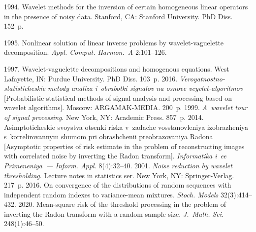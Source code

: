  \begin{multicols}{2}

\renewcommand{\bibname}{\protect\rmfamily References}

{\small\frenchspacing
 {%
 \begin{thebibliography}{99}

 1994. {Wavelet methods for the inversion of certain 
 homogeneous linear operators in the presence of noisy data.} 
 Stanford, CA: Stanford University. PhD Diss. 152~p.
 
 1995. Nonlinear solution of linear 
inverse problems by wavelet-vaguelette decomposition. 
\textit{Appl. Comput. Harmon.~A} 2:101--126.

 1997. 
{Wavelet-vaguelette decompositions and homogenous equations}. 
West Lafayette, IN: Purdue University. PhD Diss. 103~p.
 2016. \textit{Veroyatnostno-statisticheskie metody analiza 
 i~obrabotki signalov na osnove veyvlet-algoritmov} 
 [Probabilistic-statistical methods of signal analysis and 
 processing based on wavelet algorithms]. Moscow: ARGAMAK-MEDIA. 200~p.
 1999. 
\textit{A~wavelet tour of signal processing}. New York, NY: 
Academic Press. 857~p.
 2014. Asimp\-to\-ti\-che\-skie svoystva otsenki riska v~zadache 
 vos\-sta\-nov\-le\-niya izob\-ra\-zhe\-niya s~korrelirovannym shumom pri 
 obrashchenii preobrazovaniya Radona 
 [Asymptotic properties of risk estimate in the problem 
 of reconstructing images with correlated noise by inverting 
 the Radon transform]. 
 \textit{Informatika i~ee Primeneniya~--- Inform. Appl.} 8(4):32--40.
 2001. \textit{Noise reduction by wavelet thresholding}. 
Lecture notes in statistics ser.
New York, NY: Springer-Verlag. 217~p.
 2016.
 On convergence of the distributions of random sequences 
 with independent random indexes to variance-mean mixtures.
 \textit{Stoch. Models} 32(3):414--432.
 2020. Mean-square risk of the threshold 
processing in the problem of inverting the Radon 
transform with a random sample size. \textit{J.~Math. Sci.} 248(1):46--50.
 \end{thebibliography}

 }
 }

\end{multicols}

